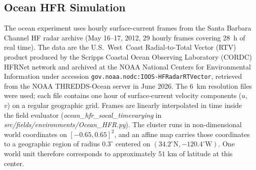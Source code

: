 \documentclass[lettersize,journal]{IEEEtran}
\begin{document}
\subsection{Ocean HFR Simulation}
\label{sec:ocean_sim}

%
%
%
%
%

The ocean experiment uses hourly surface-current frames from the
Santa Barbara Channel HF radar archive (May 16--17, 2012, 29 hourly
frames covering 28~h of real time). The data are the U.S.~West~Coast
Radial-to-Total Vector (RTV) product produced by the Scripps Coastal
Ocean Observing Laboratory (CORDC) HFRNet network and archived at the
NOAA National Centers for Environmental Information under accession
\texttt{gov.noaa.nodc:IOOS-HFRadarRTVector}, retrieved from the NOAA
THREDDS-Ocean server in June 2026. The 6~km resolution files were
used; each file contains one hour of surface-current velocity
components ($u$, $v$) on a regular geographic grid. Frames are linearly interpolated
in time inside the field evaluator
(\textit{ocean\_hfr\_socal\_timevarying} in
\textit{src/fields/environments/Ocean\_HFR.py}). The cluster runs in
non-dimensional world coordinates on $[-0.65, 0.65]^2$, and an affine
map carries those coordinates to a geographic region of radius
$0.3^{\circ}$ centered on $(34.2^{\circ}\mathrm{N},
-120.4^{\circ}\mathrm{W})$. One world unit therefore corresponds to
approximately $51$ km of latitude at this center.
\end{document}
